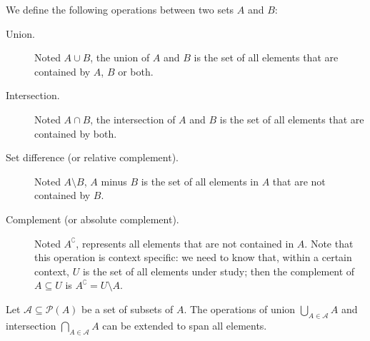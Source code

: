 \documentclass{bareminimum}
\begin{document}

\begin{defn}
	We define  the following operations between two sets $A$ and $B$:
	\begin{description}
		\item[Union.]Noted $A \cup B$, the union of $A$ and $B$ is the set of all elements that are contained by $A$, $B$ or both.
		\item[Intersection.] Noted $A \cap B$, the intersection of $A$ and $B$ is the set of all elements that are contained by both.
		\item[Set difference (or relative complement).] Noted $A \setminus B$, $A$ minus $B$ is the set of all elements in $A$ that are not contained by $B$.
		\item[Complement (or absolute complement).] Noted $A^{\complement}$, represents all elements that are not contained in $A$. Note that this operation is context specific: we need to know that, within a certain context, $U$ is the set of all elements under study; then the complement of $A \subseteq U$ is $A^{\complement} = U \setminus A$.
	\end{description}

	Let $\mathcal{A} \subseteq \mathcal{P}(A)$ be a set of subsets of $A$. The operations of union $\bigcup\limits_{A \in \mathcal{A}} A$ and intersection $\bigcap\limits_{A \in \mathcal{A}} A$ can be extended to span all elements.
\end{defn}
\end{document}
